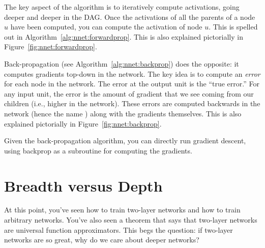 \MoveNextFigure{-8cm}

The key aspect of the  algorithm is to
iteratively compute activations, going deeper and deeper in the DAG.
Once the activations of all the parents of a node $u$ have been
computed, you can compute the activation of node $u$.  This is spelled
out in Algorithm~\ref{alg:nnet:forwardprop}.  This is also explained
pictorially in Figure~\ref{fig:nnet:forwardprop}.


Back-propagation (see Algorithm~\ref{alg:nnet:backprop}) does the
opposite: it computes gradients top-down in the network.  The key idea
is to compute an \emph{error} for each node in the network.  The error
at the output unit is the ``true error.''  For any input unit, the
error is the amount of gradient that we see coming from our children
(i.e., higher in the network).  These errors are computed backwards in
the network (hence the name ) along with the
gradients themselves.  This is also explained pictorially in
Figure~\ref{fig:nnet:backprop}.

Given the back-propagation algorithm, you can directly run gradient
descent, using backprop as a subroutine for computing the gradients.

\section{Breadth versus Depth}

At this point, you've seen how to train two-layer networks and how to
train arbitrary networks.  You've also seen a theorem that says that
two-layer networks are universal function approximators.  This begs
the question: if two-layer networks are so great, why do we care about
deeper networks?

